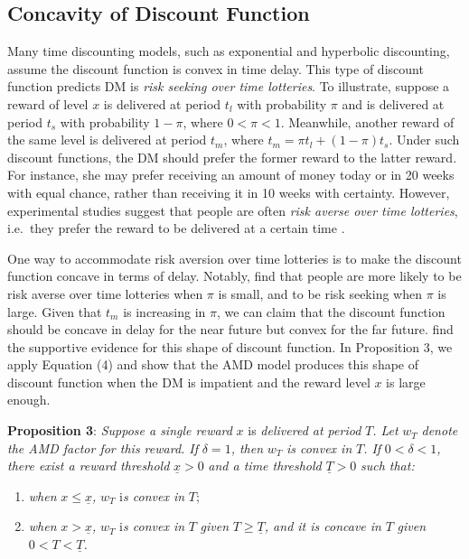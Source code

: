 \documentclass[
  12pt,
]{article}
\providecommand{\tightlist}{%
  \setlength{\itemsep}{0pt}\setlength{\parskip}{0pt}}
\begin{document}
\hypertarget{concavity-of-discount-function}{%
\subsection{Concavity of Discount
Function}\label{concavity-of-discount-function}}

Many time discounting models, such as exponential and hyperbolic
discounting, assume the discount function is convex in time delay. This
type of discount function predicts DM is \emph{risk seeking over time
lotteries}. To illustrate, suppose a reward of level \(x\) is delivered
at period \(t_l\) with probability \(\pi\) and is delivered at period
\(t_s\) with probability \(1-\pi\), where \(0<\pi<1\). Meanwhile,
another reward of the same level is delivered at period \(t_m\), where
\(t_m=\pi t_l +(1-\pi) t_s\). Under such discount functions, the DM
should prefer the former reward to the latter reward. For instance, she
may prefer receiving an amount of money today or in 20 weeks with equal
chance, rather than receiving it in 10 weeks with certainty. However,
experimental studies suggest that people are often \emph{risk averse
over time lotteries}, i.e.~they prefer the reward to be delivered at a
certain time \citep{onay2007intertemporal, dejarnette2020time}.

One way to accommodate risk aversion over time lotteries is to make the
discount function concave in terms of delay. Notably,
\citet{onay2007intertemporal} find that people are more likely to be
risk averse over time lotteries when \(\pi\) is small, and to be risk
seeking when \(\pi\) is large. Given that \(t_m\) is increasing in
\(\pi\), we can claim that the discount function should be concave in
delay for the near future but convex for the far future.
\citet{takeuchi2011non} find the supportive evidence for this shape of
discount function. In Proposition 3, we apply Equation (4) and show that
the AMD model produces this shape of discount function when the DM is
impatient and the reward level \(x\) is large enough.

\noindent \textbf{Proposition 3}: \emph{Suppose a single reward} \(x\)
is \emph{delivered at period} \(T\)\emph{. Let} \(w_T\) \emph{denote the
AMD factor for this reward. If} \(\delta =1\)\emph{, then} \(w_T\)
\emph{is convex in} \(T\)\emph{. If} \(0<\delta<1\)\emph{, there exist a
reward threshold} \(\underline{x}>0\) \emph{and a time threshold}
\(\underline{T}>0\) \emph{such that:}

\begin{enumerate}
\def\labelenumi{(\alph{enumi})}
\tightlist
\item
  \emph{when} \(x\leq \underline{x}\)\emph{,} \(w_T\) i\emph{s convex
  in} \(T\);
\item
  \emph{when} \(x > \underline{x}\)\emph{,} \(w_T\) i\emph{s convex in}
  \(T\) \emph{given} \(T\geq \underline{T}\)\emph{, and it is concave
  in} \(T\) \emph{given} \(0<T<\underline{T}\)\emph{.}
\end{enumerate}
\end{document}
